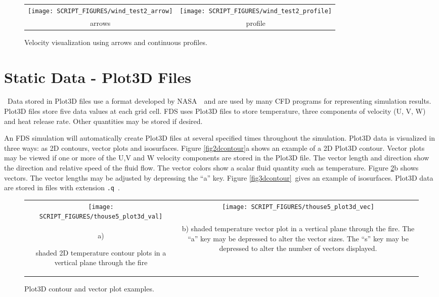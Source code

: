 \documentclass[11pt,twoside]{book}
\newcommand{\figheightA}{2.5in}
\begin{document}
\begin{figure}[bph]
\begin{center}
\begin{tabular}{cc}
\texttt{[image: SCRIPT\_FIGURES/wind\_test2\_arrow]}&
\texttt{[image: SCRIPT\_FIGURES/wind\_test2\_profile]}\\
arrows&profile\\

\end{tabular}
\caption [Velocity visualization using arrows and continuous profiles.]
{Velocity visualization using arrows and continuous profiles.}
\label{figwindprofile}%
\end{center}
\end{figure}

\section{Static Data - Plot3D Files}\ Data stored in Plot3D files
use a format developed by NASA~\cite{PLOT3D}\ and are used by many
CFD programs for representing simulation results. Plot3D files
store five data values at each grid cell. FDS uses Plot3D files to
store temperature, three components of velocity (U, V, W) and heat
release rate. Other quantities may be stored if desired.

An FDS simulation will automatically  create Plot3D files at
several specified times throughout the simulation. Plot3D data is
visualized in three ways: as 2D contours, vector plots and
isosurfaces. Figure \ref{fig2dcontour}a shows an example of a 2D
Plot3D contour. Vector plots may be viewed if one or more of the
U,V and W velocity components are stored in the Plot3D file. The
vector length and direction show the direction and relative speed
of the fluid flow. The vector colors show a scalar fluid quantity
such as temperature. Figure \ref{figvector2}b shows vectors. The
vector lengths may be adjusted by depressing the ``a'' key. Figure
\ref{fig3dcontour}\ gives an example of isosurfaces. Plot3D data
are stored in files with extension {\tt .q}\ .

\begin{figure}[bph]
\begin{center}
\begin{tabular}{cc}
\texttt{[image: SCRIPT\_FIGURES/thouse5\_plot3d\_val]}
&\texttt{[image: SCRIPT\_FIGURES/thouse5\_plot3d\_vec]}\\
a)

\parbox[t]{2.5in}{shaded 2D temperature contour plots in a vertical plane through the fire}
& b)
\parbox[t]{2.5in}{shaded temperature vector plot in a vertical plane through the fire.
The ``a'' key may be depressed to alter the vector sizes. The
``s'' key may be depressed to alter the number of vectors
displayed. }
\end{tabular}
\end{center}
\caption{Plot3D contour and vector plot examples.  }
\label{fig2dcontour}%
\label{figvector2}
\end{figure}
\end{document}
